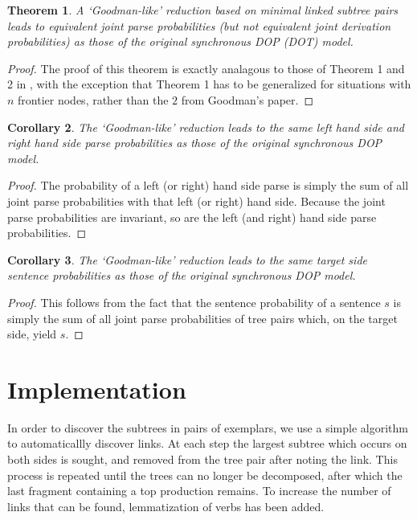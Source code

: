 \documentclass[a4paper]{article}
\newtheorem{theorem}{Theorem}[section]
\newtheorem{corollary}[theorem]{Corollary}
\theoremstyle{definition}
\begin{document}
\begin{theorem}
A `Goodman-like' reduction based on minimal linked subtree pairs leads to
equivalent joint parse probabilities (but not equivalent joint derivation
probabilities) as those of the original synchronous DOP (DOT) model.
\end{theorem}

\begin{proof}
The proof of this theorem is exactly analagous to those of Theorem 1 and 2 in \citet{goodman2003efficient}, with the exception that Theorem 1 has to be generalized for
situations with $n$ frontier nodes, rather than the $2$ from Goodman's paper.
\end{proof}

\begin{corollary}
The `Goodman-like' reduction leads to the same left hand side and right hand side parse probabilities as those of the original synchronous DOP model.
\end{corollary}

\begin{proof}
The probability of a left (or right) hand side parse is simply the sum of all joint parse
probabilities with that left (or right) hand side. Because the joint parse probabilities are invariant, so are the left (and right) hand side parse probabilities.
\end{proof}

\begin{corollary}
The `Goodman-like' reduction leads to the same target side sentence
probabilities as those of the original synchronous DOP model.
\end{corollary}

\begin{proof}
This follows from the fact that the sentence probability of a sentence $s$ is
simply the sum of all joint parse probabilities of tree pairs which, on the
target side, yield $s$.
\end{proof}

\section{Implementation}


In order to discover the subtrees in pairs of exemplars, we use a simple
algorithm to automaticallly discover links. At each step the largest subtree
which occurs on both sides is sought, and removed from the tree pair after
noting the link. This process is repeated until the trees can no longer be
decomposed, after which the last fragment containing a top production remains.
To increase the number of links that can be found, lemmatization of verbs has
been added.
\end{document}
